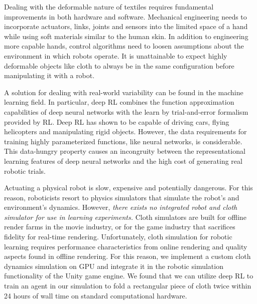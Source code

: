 \documentclass[\home/main.tex]{subfiles}
\begin{document}
Dealing with the deformable nature of textiles requires fundamental improvements in both hardware and software. Mechanical engineering needs to incorporate actuators, links, joints and sensors into the limited space of a hand while using soft materials similar to the human skin. In addition to engineering more capable hands, control algorithms need to loosen assumptions about the environment in which robots operate. It is unattainable to expect highly deformable objects like cloth to always be in the same configuration before manipulating it with a robot.

A solution for dealing with real-world variability can be found in the machine learning field. In particular, deep \gls{RL} combines the function approximation capabilities of deep neural networks with the learn by trial-and-error formalism provided by \gls{RL}. Deep \gls{RL} has shown to be capable of driving cars, flying helicopters and manipulating rigid objects. However, the data requirements for training highly parameterized functions, like neural networks, is considerable. This data-hungry property causes an incongruity between the representational learning features of deep neural networks and the high cost of generating real robotic trials.



Actuating a physical robot is slow, expensive and potentially dangerous. For this reason, roboticists resort to physics simulators that simulate the robot's and environment's dynamics. However, \emph{there exists no integrated robot and cloth simulator for use in learning experiments.}
Cloth simulators are built for offline render farms in the movie industry, or for the game industry that sacrifices fidelity for real-time rendering. Unfortunately, cloth simulation for robotic learning requires performance characteristics from online rendering and quality aspects found in offline rendering. For this reason, we implement a custom cloth dynamics simulation on GPU and integrate it in the robotic simulation functionality of the Unity game engine.
We found that we can utilize deep \gls{RL} to train an agent in our simulation to fold a rectangular piece of cloth twice within \qty{24}{} hours of wall time on standard computational hardware. 
\end{document}
